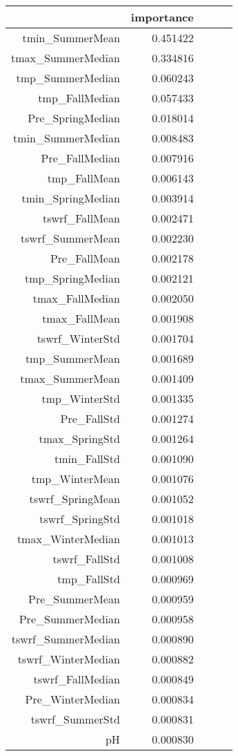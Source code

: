 \begin{tabular}{rrrrr}
\toprule
 & importance \\
\midrule
tmin_SummerMean & 0.451422 \\
tmax_SummerMedian & 0.334816 \\
tmp_SummerMedian & 0.060243 \\
tmp_FallMedian & 0.057433 \\
Pre_SpringMedian & 0.018014 \\
tmin_SummerMedian & 0.008483 \\
Pre_FallMedian & 0.007916 \\
tmp_FallMean & 0.006143 \\
tmin_SpringMedian & 0.003914 \\
tswrf_FallMean & 0.002471 \\
tswrf_SummerMean & 0.002230 \\
Pre_FallMean & 0.002178 \\
tmp_SpringMedian & 0.002121 \\
tmax_FallMedian & 0.002050 \\
tmax_FallMean & 0.001908 \\
tswrf_WinterStd & 0.001704 \\
tmp_SummerMean & 0.001689 \\
tmax_SummerMean & 0.001409 \\
tmp_WinterStd & 0.001335 \\
Pre_FallStd & 0.001274 \\
tmax_SpringStd & 0.001264 \\
tmin_FallStd & 0.001090 \\
tmp_WinterMean & 0.001076 \\
tswrf_SpringMean & 0.001052 \\
tswrf_SpringStd & 0.001018 \\
tmax_WinterMedian & 0.001013 \\
tswrf_FallStd & 0.001008 \\
tmp_FallStd & 0.000969 \\
Pre_SummerMean & 0.000959 \\
Pre_SummerMedian & 0.000958 \\
tswrf_SummerMedian & 0.000890 \\
tswrf_WinterMedian & 0.000882 \\
tswrf_FallMedian & 0.000849 \\
Pre_WinterMedian & 0.000834 \\
tswrf_SummerStd & 0.000831 \\
pH & 0.000830 \\

\end{tabular}
